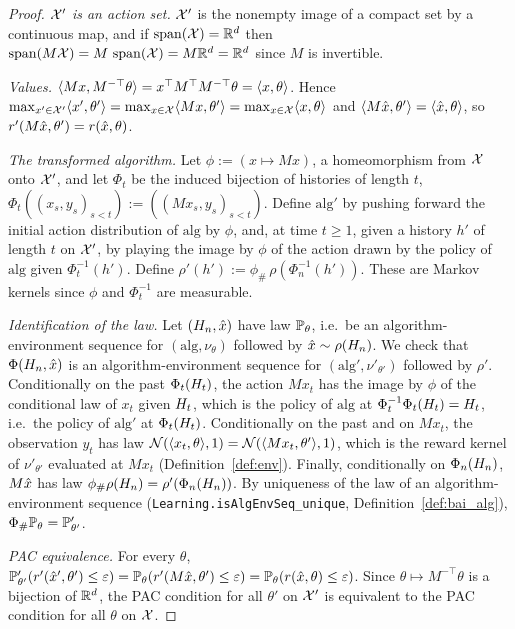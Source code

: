 \begin{proof}
\emph{$\mathcal{X}'$ is an action set.} $\mathcal{X}'$ is the nonempty image of a compact set by a continuous map,
and if $\operatorname{span}(\mathcal{X}) = \mathbb{R}^d$ then $\operatorname{span}(M\mathcal{X}) = M\,\operatorname{span}(\mathcal{X}) = M\mathbb{R}^d = \mathbb{R}^d$ since $M$ is invertible.

\emph{Values.} $\langle Mx, M^{-\top}\theta \rangle = x^\top M^\top M^{-\top}\theta = \langle x, \theta \rangle$.
Hence $\max_{x'\in\mathcal{X}'}\langle x', \theta' \rangle = \max_{x\in\mathcal{X}}\langle Mx, \theta' \rangle = \max_{x\in\mathcal{X}}\langle x, \theta \rangle$
and $\langle M\hat{x}, \theta' \rangle = \langle \hat{x}, \theta \rangle$, so $r'(M\hat{x},\theta') = r(\hat{x},\theta)$.

\emph{The transformed algorithm.} Let $\phi := (x \mapsto Mx)$, a homeomorphism from $\mathcal{X}$
onto $\mathcal{X}'$, and let $\Phi_t$ be the induced bijection of histories of length $t$,
$\Phi_t((x_s,y_s)_{s<t}) := ((Mx_s,y_s)_{s<t})$. Define $\mathrm{alg}'$ by pushing forward the
initial action distribution of $\mathrm{alg}$ by $\phi$, and, at time $t \ge 1$, given a
history $h'$ of length $t$ on $\mathcal{X}'$, by playing the image by $\phi$ of the action drawn by
the policy of $\mathrm{alg}$ given $\Phi_t^{-1}(h')$. Define
$\rho'(h') := \phi_\#\,\rho(\Phi_n^{-1}(h'))$. These are Markov kernels since $\phi$ and
$\Phi_t^{-1}$ are measurable.

\emph{Identification of the law.} Let $(H_n,\hat{x})$ have law $\mathbb{P}_\theta$, i.e.\ be an
algorithm-environment sequence for $(\mathrm{alg},\nu_\theta)$ followed by
$\hat{x} \sim \rho(H_n)$. We check that $\Phi(H_n,\hat{x})$ is an algorithm-environment
sequence for $(\mathrm{alg}',\nu'_{\theta'})$ followed by $\rho'$. Conditionally on the past
$\Phi_t(H_t)$, the action $Mx_t$ has the image by $\phi$ of the conditional law of $x_t$
given $H_t$, which is the policy of $\mathrm{alg}$ at $\Phi_t^{-1}\Phi_t(H_t) = H_t$,
i.e.\ the policy of $\mathrm{alg}'$ at $\Phi_t(H_t)$. Conditionally on the past and on
$Mx_t$, the observation $y_t$ has law $\mathcal{N}(\langle x_t, \theta \rangle, 1) = \mathcal{N}(\langle Mx_t, \theta' \rangle,1)$,
which is the reward kernel of $\nu'_{\theta'}$ evaluated at $Mx_t$
(Definition~\ref{def:env}). Finally, conditionally on $\Phi_n(H_n)$, $M\hat{x}$ has law
$\phi_\#\rho(H_n) = \rho'(\Phi_n(H_n))$. By uniqueness of the law of an
algorithm-environment sequence (\texttt{Learning.isAlgEnvSeq\_unique},
Definition~\ref{def:bai_alg}), $\Phi_\#\mathbb{P}_\theta = \mathbb{P}'_{\theta'}$.

\emph{PAC equivalence.} For every $\theta$,
$\mathbb{P}'_{\theta'}(r'(\hat{x}',\theta') \le \varepsilon) = \mathbb{P}_\theta(r'(M\hat{x},\theta') \le \varepsilon)
= \mathbb{P}_\theta(r(\hat{x},\theta)\le\varepsilon)$. Since $\theta \mapsto M^{-\top}\theta$ is a bijection
of $\mathbb{R}^d$, the PAC condition for all $\theta'$ on $\mathcal{X}'$ is equivalent to the PAC condition
for all $\theta$ on $\mathcal{X}$.
\end{proof}

